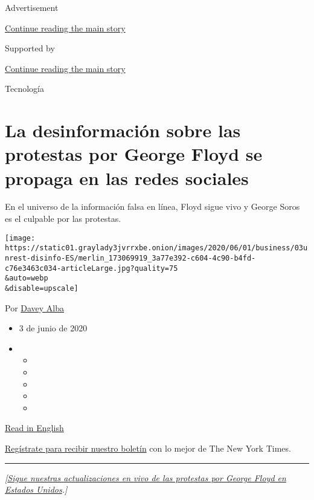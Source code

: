 Advertisement

\protect\hyperlink{after-top}{Continue reading the main story}

Supported by

\protect\hyperlink{after-sponsor}{Continue reading the main story}

Tecnología

\hypertarget{la-desinformaciuxf3n-sobre-las-protestas-por-george-floyd-se-propaga-en-las-redes-sociales}{%
\section{La desinformación sobre las protestas por George Floyd se
propaga en las redes
sociales}\label{la-desinformaciuxf3n-sobre-las-protestas-por-george-floyd-se-propaga-en-las-redes-sociales}}

En el universo de la información falsa en línea, Floyd sigue vivo y
George Soros es el culpable por las protestas.

\texttt{[image: https://static01.graylady3jvrrxbe.onion/images/2020/06/01/business/03unrest-disinfo-ES/merlin\_173069919\_3a77e392-c604-4c90-b4fd-c76e3463c034-articleLarge.jpg?quality=75\\\&auto=webp\\\&disable=upscale]}

Por \href{https://www.nytimes3xbfgragh.onion/by/davey-alba}{Davey Alba}

\begin{itemize}
\item
  3 de junio de 2020
\item
  \begin{itemize}
  \item
  \item
  \item
  \item
  \item
  \end{itemize}
\end{itemize}

\href{https://www.nytimes3xbfgragh.onion/2020/06/01/technology/george-floyd-misinformation-online.html}{Read
in English}

\href{https://www.nytimes3xbfgragh.onion/newsletters/el-times}{Regístrate
para recibir nuestro boletín} con lo mejor de The New York Times.

\begin{center}\rule{0.5\linewidth}{\linethickness}\end{center}

\emph{{[}}\href{https://www.nytimes3xbfgragh.onion/2020/06/02/us/protests-today-george-floyd.html}{\emph{Sigue
nuestras actualizaciones en vivo de las protestas por George Floyd en
Estados Unidos}}\emph{.{]}}

